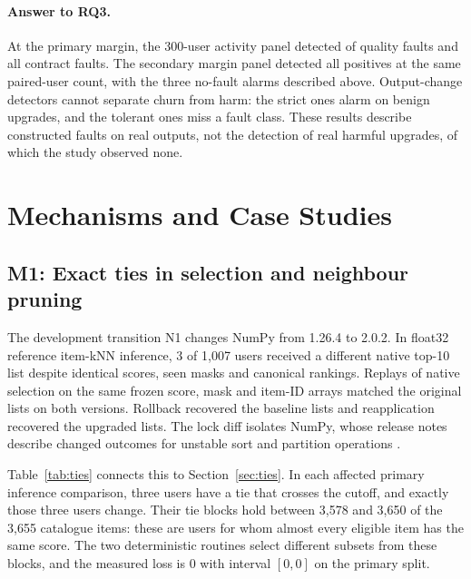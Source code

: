 \documentclass[11pt,a4paper]{article}
\newcommand{\FloatBarrier}{}
\begin{document}
\paragraph{Answer to RQ3.} At the primary margin, the 300-user activity panel
detected \synPrimaryFOne{} of \synFOne{} quality faults and all
\synContractPositives{} contract faults. The secondary margin panel detected
all positives at the same paired-user count, with the three no-fault alarms
described above. Output-change
detectors cannot separate churn from harm: the strict ones alarm on benign
upgrades, and the tolerant ones miss a fault class. These results describe
constructed faults on real outputs, not the detection of real harmful
upgrades, of which the study observed none.

\FloatBarrier

\section{Mechanisms and Case Studies}
\label{sec:mechanisms}

\subsection{M1: Exact ties in selection and neighbour pruning}
\label{sec:m1}

The development transition N1 changes NumPy from 1.26.4 to 2.0.2. In
float32 reference item-kNN inference, 3 of 1{,}007 users received a
different native top-10 list despite identical scores, seen masks and
canonical rankings. Replays of native selection on the same frozen score,
mask and item-ID arrays matched the original lists on both versions.
Rollback recovered the baseline lists and reapplication recovered the
upgraded lists. The lock diff isolates NumPy, whose release notes describe
changed outcomes for unstable sort and partition operations
\citep{numpy2releasenotes}.

Table~\ref{tab:ties} connects this to Section~\ref{sec:ties}. In each affected
primary inference comparison, three users have a tie that crosses the cutoff, and
exactly those three users change. Their tie blocks hold between 3{,}578 and
3{,}650 of the 3{,}655 catalogue items: these are users for whom almost every
eligible item has the same score. The two deterministic routines select
different subsets from these blocks, and the measured loss is $0$ with
interval $[0,0]$ on the primary split.
\end{document}
